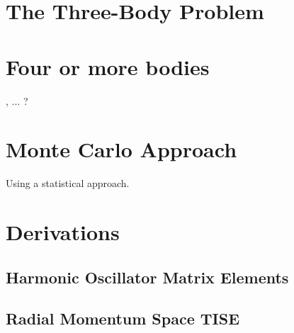 \documentclass[12pt,a4paper]{report}
\begin{document}
\chapter{The Three-Body Problem}
\label{cha:three_body}


\chapter{Four or more bodies}
\label{cha:four_or_more_bodies}

,  ... ?

\chapter{Monte Carlo Approach}
\label{cha:monte_carlo}

Using a statistical approach.

\appendix

\chapter{Derivations}

\section{Harmonic Oscillator Matrix Elements}
\label{sec:HO matrix elements}



\section{Radial Momentum Space TISE}
\label{sec:radial_mom_space_TISE}




{}
\end{document}
